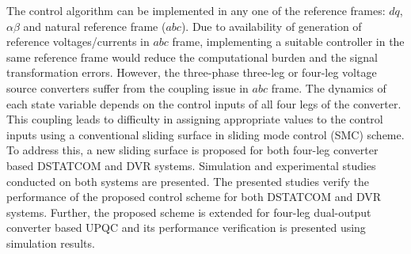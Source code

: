 The control algorithm can be implemented in any one of the reference frames: $dq$, $\alpha \beta$ and natural reference frame ($abc$). Due to availability of generation of reference voltages/currents in $abc$ frame, implementing a suitable controller in the same reference frame would reduce the computational burden and the signal transformation errors. However, the three-phase three-leg or four-leg voltage source converters suffer from the coupling issue in $abc$ frame. The dynamics of each state variable depends on the control inputs of all four legs of the converter. This coupling leads to difficulty in assigning appropriate values to the control inputs using a conventional sliding surface in sliding mode control (SMC) scheme. To address this, a new sliding surface is proposed for both four-leg converter based DSTATCOM and DVR systems. Simulation and experimental studies conducted on both systems are presented. The presented studies verify the performance of the proposed control scheme for both DSTATCOM and DVR systems. Further, the proposed scheme is extended for four-leg dual-output converter based UPQC and its performance verification is presented using simulation results. 
